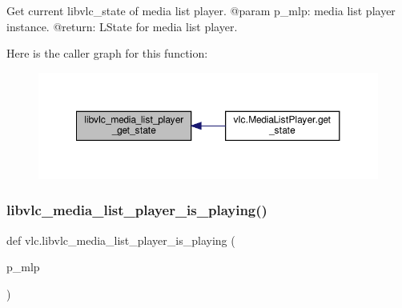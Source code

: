 \begin{DoxyVerb}Get current libvlc_state of media list player.
@param p_mlp: media list player instance.
@return: L{State} for media list player.
\end{DoxyVerb}
 Here is the caller graph for this function\+:
\nopagebreak
\begin{figure}[H]
\begin{center}
\leavevmode
\includegraphics[width=350pt]{namespacevlc_a763990d86ad08b9968f1f4263d634f26_icgraph}
\end{center}
\end{figure}
\mbox{\label{namespacevlc_a0c4e9ab9a5ffb361e99a2d4f61386e4c}} 
\subsubsection{\texorpdfstring{libvlc\+\_\+media\+\_\+list\+\_\+player\+\_\+is\+\_\+playing()}{libvlc\_media\_list\_player\_is\_playing()}}
{\footnotesize\ttfamily def vlc.\+libvlc\+\_\+media\+\_\+list\+\_\+player\+\_\+is\+\_\+playing (\begin{DoxyParamCaption}\item[{}]{p\+\_\+mlp }\end{DoxyParamCaption})}

